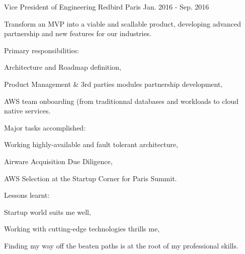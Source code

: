 \begin{cventries}
  \cventry
    {Vice President of Engineering} %
    {Redbird} %
    {Paris} %
    {Jan. 2016 - Sep. 2016} %
    {
      \begin{cvitems} %
        \item {Transform an MVP into a viable and scallable product, developing advanced partnership and new features for our industries.}
        \item {Primary responsibilities:} %
        \begin{cvsubitems}
          \item {Architecture and Roadmap definition,}
          \item {Product Management \& 3rd parties modules partnership development,}
          \item {AWS team onboarding (from traditionnal databases and workloads to cloud native services.}
        \end{cvsubitems}
        \item {Major tasks accomplished:}
        \begin{cvsubitems}
          \item {Working highly-available and fault tolerant architecture,}
          \item {Airware Acquisition Due Diligence,}
          \item {AWS Selection at the Startup Corner for Paris Summit.}
        \end{cvsubitems}
        \item {Lessons learnt:}
        \begin{cvsubitems}
          \item {Startup world suits me well,}
          \item {Working with cutting-edge technologies thrills me,}
          \item {Finding my way off the beaten paths is at the root of my professional skills.}
        \end{cvsubitems}
      \end{cvitems}
    }


\end{cventries}
